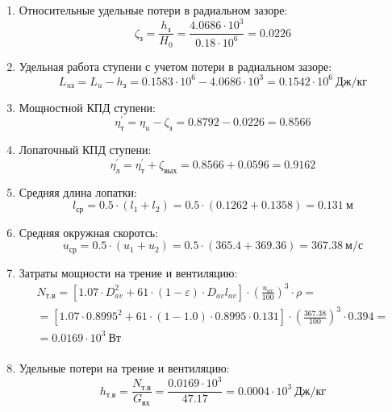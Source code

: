 \documentclass[a4paper,12pt]{article}
\begin{document}
\begin{enumerate}
        \item Относительные удельные потери в радиальном зазоре:
        \[
            \zeta_з = \frac{ h_з }{ H_0 } =
                \frac{ 4.0686 \cdot 10^3 }{ 0.18 \cdot 10^6 } =
            0.0226
        \]

        \item Удельная работа ступени с учетом потери в радиальном зазоре:
        \[
            L_{uз} = L_u - h_з = 0.1583 \cdot 10^6 -
                4.0686 \cdot 10^3 =
            0.1542 \cdot 10^6 \ Дж/кг
        \]

        \item Мощностной КПД ступени:
        \[
            \eta_т^\prime = \eta_u - \zeta_з =
                0.8792 - 0.0226 = 0.8566
        \]

        \item Лопаточный КПД ступени:
        \[
            \eta_л^\prime = \eta_т^\prime + \zeta_{вых} =
                 0.8566 +  0.0596 =
            0.9162
        \]

        \item Средняя длина лопатки:
        \[
            l_{ср} = 0.5 \cdot (l_1 + l_2) =
                0.5 \cdot (0.1262 + 0.1358) =
            0.131\ м
        \]

        \item Средняя окружная скоротсь:
        \[
            u_{ср} = 0.5 \cdot (u_1 + u_2) =
                0.5 \cdot (365.4 + 369.36) =
            367.38\ м/с
        \]

        \item Затраты мощности на трение и вентиляцию:
        \begin{gather*}
            N_{т.в} = \left[
                    1.07 \cdot D_{av}^2 + 61 \cdot (1 - \varepsilon) \cdot D_{av} l_{av}
            \right] \cdot
            \left(
                \frac{ u_{av} }{ 100 }
            \right) ^ 3 \cdot
            \rho =\\
            = \left[
                1.07 \cdot 0.8995^2 +
                61 \cdot (1 - 1.0) \cdot
                0.8995 \cdot 0.131
            \right] \cdot
            \left(
                \frac{ 367.38 }{ 100 }
            \right) ^ 3 \cdot
            0.394=\\
            = 0.0169 \cdot 10^3 \ Вт \\
        \end{gather*}

        \item Удельные потери на трение и вентиляцию:
        \[
            h_{т.в} = \frac{ N_{т.в} }{ G_{вх} } =
                \frac{
                    0.0169 \cdot 10^3
                }{
                    47.17
                }
            = 0.0004 \cdot 10^3 \ Дж/кг
        \]


\end{enumerate}
\end{document}
